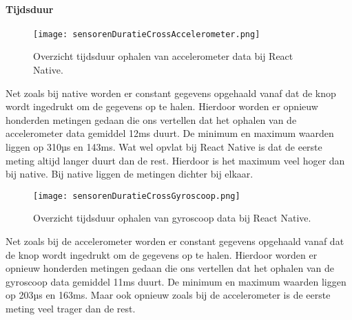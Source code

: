 \paragraph{Tijdsduur}
\begin{figure}[H]
    \centering
    \texttt{[image: sensorenDuratieCrossAccelerometer.png]}
    \caption{Overzicht tijdsduur ophalen van accelerometer data bij React Native.}
\end{figure}
Net zoals bij native worden er constant gegevens opgehaald vanaf dat de knop wordt ingedrukt om de
gegevens op te halen. Hierdoor worden er opnieuw honderden metingen gedaan die ons vertellen dat het ophalen
van de accelerometer data gemiddel 12ms duurt. De minimum en maximum waarden liggen op 310µs en 143ms.
Wat wel opvlat bij React Native is dat de eerste meting altijd langer duurt dan de rest. 
Hierdoor is het maximum veel hoger dan bij native. Bij native liggen de metingen dichter bij elkaar. 
\begin{figure}[H]
    \centering
    \texttt{[image: sensorenDuratieCrossGyroscoop.png]}
    \caption{Overzicht tijdsduur ophalen van gyroscoop data bij React Native.}
\end{figure}
Net zoals bij de accelerometer worden er constant gegevens opgehaald vanaf dat de knop wordt ingedrukt om de 
gegevens op te halen. Hierdoor worden er opnieuw honderden metingen gedaan die ons vertellen dat het ophalen
van de gyroscoop data gemiddel 11ms duurt. De minimum en maximum waarden liggen op 203µs en 163ms.
Maar ook opnieuw zoals bij de accelerometer is de eerste meting veel trager dan de rest.

